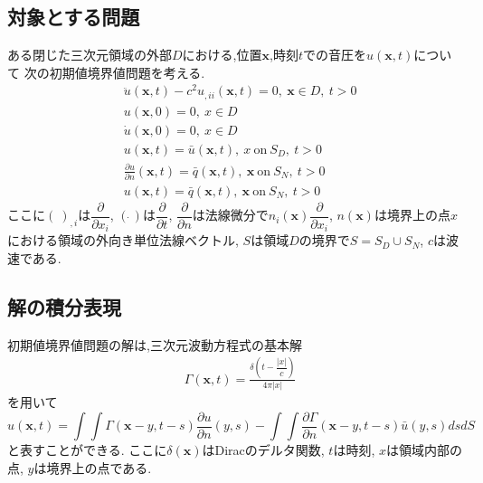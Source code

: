 \documentclass[dvipdfmx]{ampbt}
\begin{document}
\subsection{対象とする問題}
\label{q}
ある閉じた三次元領域の外部$D$における,位置$\bm{x}$,時刻$t$での音圧を$u(\bm{x},t)$について
次の初期値境界値問題を考える.
\begin{align}
&\ddot{u}(\bm{x},t)-c^2 u_{,ii}(\bm{x},t)=0,\  \bm{x} \in D,\ t>0 \\
&u(\bm{x},0)=0,\  x \in D \\
&\dot{u}(\bm{x},0)=0,\  x \in D \\
&u(\bm{x},t)=\bar{u}(\bm{x},t),\  x\  \mbox{on} \ S_D,\ t>0 \\
&\frac{\partial{u}}{\partial{n}} (\bm{x},t)=\bar{q}(\bm{x},t),\  \bm{x}\  \mbox{on} \ S_N,\ t>0 \\
&u(\bm{x},t)=\bar{q}(\bm{x},t),\  \bm{x}\  \mbox{on} \ S_N,\ t>0
\end{align}
ここに$(\ )_{,i}$は$\dfrac{\partial{}}{\partial{x_i}}$,
$(\dot{\ })$は$\dfrac{\partial{}}{\partial{t}}$,
$\dfrac{\partial{}}{\partial{n}}$は法線微分で$n_i(\bm{x}) \dfrac{\partial{}}{\partial{x_i}}$,
$n(\bm{x})$は境界上の点$x$における領域の外向き単位法線ベクトル,
$S$は領域$D$の境界で$S=S_D \cup S_N$,
$c$は波速である.

\subsection{解の積分表現}
初期値境界値問題の解は,三次元波動方程式の基本解
\begin{align}
&\Gamma(\bm{x},t) = \displaystyle \frac{\delta(t-\dfrac{|x|}{c})}{4\pi|x|}
\end{align}
を用いて
\begin{equation}
  \label{eq:境界積分方程式}
u(\bm{x},t) = \int\!\!\!\int \Gamma(\bm{x}-y,t-s) \frac{\partial u}{\partial n}(y,s) - \int\!\!\!\int \frac{\partial \Gamma}{\partial n}(\bm{x}-y,t-s) \bar{u}(y,s) ds dS
\end{equation}
と表すことができる.
ここに$\delta(\bm{x})$はDiracのデルタ関数,
$t$は時刻,
$x$は領域内部の点,
$y$は境界上の点である.
\end{document}
